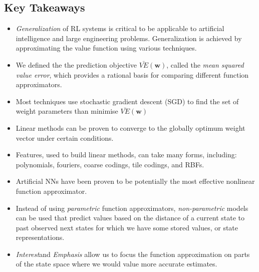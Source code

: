 \subsection{Key Takeaways}
\begin{itemize}
\item \textit{Generalization} of RL systems is critical to be applicable to artificial intelligence and large engineering problems. Generalization is achieved by approximating the value function using various techniques.
\item We defined the the prediction objective $\bar{VE}(\textbf{w})$, called the \textit{mean squared value error}, which provides a rational basis for comparing different function approximators.
\item Most techniques use stochastic gradient descent (SGD) to find the set of weight parameters than minimise $\bar{VE}(\textbf{w})$
\item Linear methods can be proven to converge to the globally optimum weight vector under certain conditions. 
\item Features, used to build linear methods, can take many forms, including: polynomials, fouriers, coarse codings, tile codings, and RBFs.
\item Artificial NNs have been proven to be potentially the most effective nonlinear function approximator.
\item Instead of using \textit{parametric} function approximators, \textit{non-parametric} models can be used that predict values based on the distance of a current state to past observed next states for which we have some stored values, or state representations.
\item \textit{Interest}and \textit{Emphasis} allow us to focus the function approximation on parts of the state space where we would value more accurate estimates.
\end{itemize}




